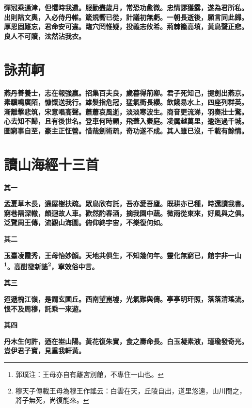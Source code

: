 \textbf{彈冠乘通津，但懼時我遺。服勤盡歲月，常恐功愈微。忠情謬獲露，遂為君所私。出則陪文輿，入必侍丹帷。箴規嚮已從，計議初無虧。一朝長逝後，願言同此歸。厚恩固難忘，君命安可違。臨穴罔惟疑，投義志攸希。荊棘籠高墳，黃鳥聲正悲。良人不可贖，泫然沾我衣。}

\section{詠荊軻}

\textbf{燕丹善養士，志在報強嬴。招集百夫良，歲暮得荊卿。君子死知己，提劍出燕京。素驥鳴廣陌，慷慨送我行。雄髮指危冠，猛氣衝長纓。飲餞易水上，四座列群英。漸離擊悲筑，宋意唱高聲。蕭蕭哀風逝，淡淡寒波生。商音更流涕，羽奏壯士驚。心去知不歸，且有後世名。登車何時顧，飛蓋入秦庭。凌厲越萬里，逶迤過千城。圖窮事自至，豪主正怔營。惜哉劍術疏，奇功遂不成。其人雖已沒，千載有餘情。}

\section{讀山海經十三首}

\begin{quoting}\textbf{其一}\end{quoting}

\textbf{孟夏草木長，遶屋樹扶疏。眾鳥欣有託，吾亦愛吾廬。既耕亦已種，時還讀我書。窮巷隔深轍，頗迴故人車。歡然酌春酒，摘我園中蔬。微雨從東來，好風與之俱。泛覽周王傳，流觀山海圖。俯仰終宇宙，不樂復何如。}

\begin{quoting}\textbf{其二}\end{quoting}

\textbf{玉臺凌霞秀，王母怡妙顏。天地共俱生，不知幾何年。靈化無窮已，館宇非一山\footnote{郭璞注：王母亦自有離宮別館，不專住一山也。}。高酣發新謠\footnote{穆天子傳載王母為穆王作謠云：白雲在天，丘陵自出，道里悠遠，山川間之，將子無死，尚復能來。}，寧效俗中言。}

\begin{quoting}\textbf{其三}\end{quoting}

\textbf{迢遞槐江嶺，是謂玄圃丘。西南望崑墟，光氣難與儔。亭亭明玕照，落落清瑤流。恨不及周穆，託乘一來遊。}

\begin{quoting}\textbf{其四}\end{quoting}

\textbf{丹木生何許，迺在峚山陽。黃花復朱實，食之壽命長。白玉凝素液，瑾瑜發奇光。豈伊君子寶，見重我軒黃。}


